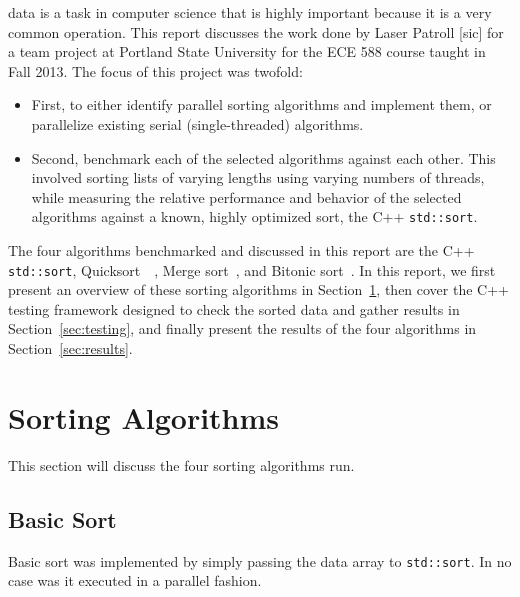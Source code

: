 \documentclass[journal]{IEEEtran}
\begin{document}
 data is a task in computer science that is highly important because it is a very common operation. This report discusses the work done by Laser Patroll [sic] for a team project at Portland State University for the ECE 588 course taught in Fall 2013. The focus of this project was twofold: 
\begin{itemize}
\item First, to either identify parallel sorting algorithms and implement them, or parallelize existing serial (single-threaded) algorithms. 
\item Second, benchmark each of the selected algorithms against each other.  This involved sorting lists of varying lengths using varying numbers of threads, while measuring the relative performance and behavior of the selected algorithms against a known, highly optimized sort, the C++ \texttt{std::sort}.
\end{itemize}


The four algorithms benchmarked and discussed in this report are the C++ \texttt{std::sort}, Quicksort~\cite{Hoare1961}~\cite{Hoare1962}, Merge sort~\cite{Knuth:1998:ACP:280635}, and Bitonic sort~\cite{Batcher1968}. In this report, we first present an overview of these sorting algorithms in Section~\ref{sec:sorting}, then cover the C++ testing framework designed to check the sorted data and gather results in Section~\ref{sec:testing}, and finally present the results of the four algorithms in Section~\ref{sec:results}.




\section{Sorting Algorithms}
\label{sec:sorting}
This section will discuss the four sorting algorithms run.

\subsection{Basic Sort}
Basic sort was implemented by simply passing the data array to \texttt{std::sort}. In no case was it executed in a parallel fashion.
\end{document}
